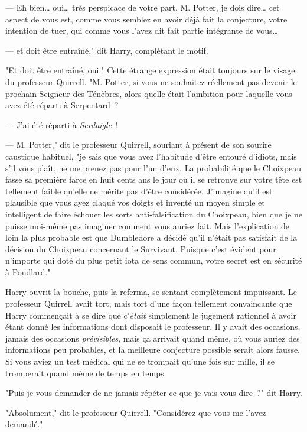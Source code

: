 --- Eh bien… oui… très perspicace de votre part, M. Potter, je dois dire… cet aspect de vous est, comme vous semblez en avoir déjà fait la conjecture, votre intention de tuer, qui comme vous l'avez dit fait partie intégrante de vous…

--- et doit être entraîné," dit Harry, complétant le motif.

"Et doit être entraîné, oui." Cette étrange expression était toujours sur le visage du professeur Quirrell. "M. Potter, si vous ne souhaitez réellement pas devenir le prochain Seigneur des Ténèbres, alors quelle était l'ambition pour laquelle vous avez été réparti à Serpentard~?

--- J'ai été réparti à \emph{Serdaigle}~!

--- M. Potter," dit le professeur Quirrell, souriant à présent de son sourire caustique habituel, "je sais que vous avez l'habitude d'être entouré d'idiots, mais s'il vous plaît, ne me prenez pas pour l'un d'eux. La probabilité que le Choixpeau fasse sa première farce en huit cents ans le jour où il se retrouve sur votre tête est tellement faible qu'elle ne mérite pas d'être considérée. J'imagine qu'il est plausible que vous ayez claqué vos doigts et inventé un moyen simple et intelligent de faire échouer les sorts anti-falsification du Choixpeau, bien que je ne puisse moi-même pas imaginer comment vous auriez fait. Mais l'explication de loin la plus probable est que Dumbledore a décidé qu'il n'était pas satisfait de la décision du Choixpeau concernant le Survivant. Puisque c'est évident pour n'importe qui doté du plus petit iota de sens commun, votre secret est en sécurité à Poudlard."

Harry ouvrit la bouche, puis la referma, se sentant complètement impuissant. Le professeur Quirrell avait tort, mais tort d'une façon tellement convaincante que Harry commençait à se dire que c'\emph{était} simplement le jugement rationnel à avoir étant donné les informations dont disposait le professeur. Il y avait des occasions, jamais des occasions \emph{prévisibles}, mais ça arrivait quand même, où vous auriez des informations peu probables, et la meilleure conjecture possible serait alors fausse. Si vous aviez un test médical qui ne se trompait qu'une fois sur mille, il se tromperait quand même de temps en temps.

"Puis-je vous demander de ne jamais répéter ce que je vais vous dire~?" dit Harry.

"Absolument," dit le professeur Quirrell. "Considérez que vous me l'avez demandé."

